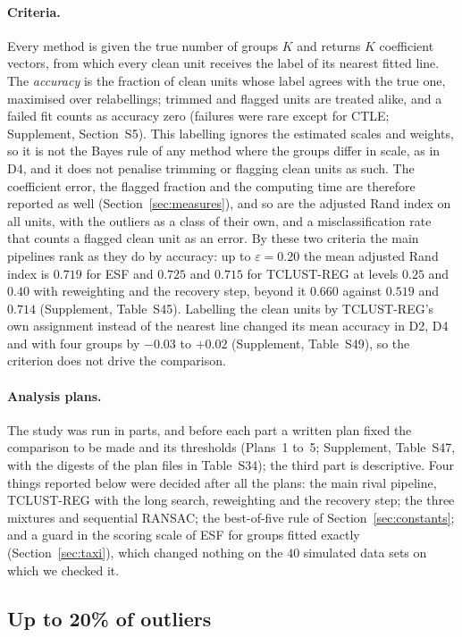 \paragraph{Criteria.} Every method is given the true number of groups $K$ and returns $K$
coefficient vectors, from which every clean unit receives the label of its nearest fitted
line. The \emph{accuracy} is the fraction of clean units whose label agrees with the true one,
maximised over relabellings; trimmed and flagged units are treated alike, and a failed fit counts
as accuracy zero (failures were rare except for CTLE; Supplement, Section~S5). This labelling
ignores the estimated scales and weights, so it is not the Bayes rule of any method where the
groups differ in scale, as in D4, and it does not penalise trimming or flagging clean units as
such. The coefficient error, the flagged fraction and the computing time are therefore
reported as well (Section~\ref{sec:measures}), and so are the adjusted Rand index on all
units, with the outliers as a class of their own, and a misclassification rate that counts a
flagged clean unit as an error. By these two criteria the main pipelines rank as they do by accuracy: up to
$\varepsilon=0.20$ the mean adjusted Rand index is $0.719$ for ESF and $0.725$ and $0.715$ for
TCLUST-REG at levels $0.25$ and $0.40$ with reweighting and the recovery step, beyond it $0.660$
against $0.519$ and $0.714$ (Supplement, Table~S45). Labelling the clean units by TCLUST-REG's
own assignment instead of the nearest line changed its mean accuracy in D2, D4 and with four
groups by $-0.03$ to $+0.02$ (Supplement, Table~S49), so the criterion does not drive the
comparison.

\paragraph{Analysis plans.} The study was run in parts, and before each part a written plan
fixed the comparison to be made and its thresholds (Plans~1 to~5; Supplement, Table~S47, with
the digests of the plan files in Table~S34); the third part is descriptive. Four things
reported below were decided after all the plans: the main rival pipeline, TCLUST-REG with the
long search, reweighting and the recovery step; the three mixtures and sequential RANSAC; the
best-of-five rule of Section~\ref{sec:constants}; and a guard in the scoring scale of ESF for
groups fitted exactly (Section~\ref{sec:taxi}), which changed nothing on the $40$ simulated
data sets on which we checked it.

\subsection{Up to 20\% of outliers}
\label{sec:low}


